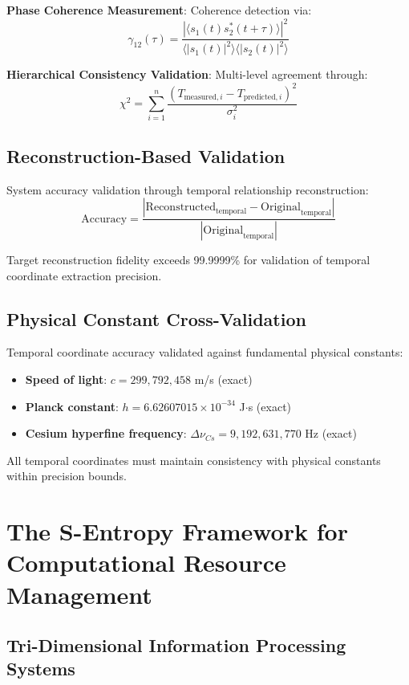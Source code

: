 \documentclass[12pt,a4paper]{article}
\begin{document}
{\textbf{Phase Coherence Measurement}: Coherence detection via:
$$\gamma_{12}(\tau) = \frac{|\langle s_1(t)s_2^*(t+\tau)\rangle|^2}{\langle |s_1(t)|^2\rangle\langle |s_2(t)|^2\rangle}$$

\textbf{Hierarchical Consistency Validation}: Multi-level agreement through:
$$\chi^2 = \sum_{i=1}^{n} \frac{(T_{\text{measured},i} - T_{\text{predicted},i})^2}{\sigma_i^2}$$

\subsection{Reconstruction-Based Validation}

System accuracy validation through temporal relationship reconstruction:
$$\text{Accuracy} = \frac{|\text{Reconstructed}_{\text{temporal}} - \text{Original}_{\text{temporal}}|}{|\text{Original}_{\text{temporal}}|}$$

Target reconstruction fidelity exceeds 99.9999\% for validation of temporal coordinate extraction precision.

\subsection{Physical Constant Cross-Validation}

Temporal coordinate accuracy validated against fundamental physical constants:

\begin{itemize}
\item \textbf{Speed of light}: $c = 299,792,458$ m/s (exact)
\item \textbf{Planck constant}: $h = 6.62607015 \times 10^{-34}$ J$\cdot$s (exact)
\item \textbf{Cesium hyperfine frequency}: $\Delta \nu_{Cs} = 9,192,631,770$ Hz (exact)
\end{itemize}

All temporal coordinates must maintain consistency with physical constants within precision bounds.

\section{The S-Entropy Framework for Computational Resource Management}

\subsection{Tri-Dimensional Information Processing Systems}

}
\end{document}
